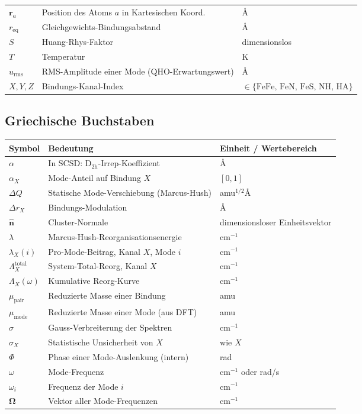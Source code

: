 \documentclass[11pt,a4paper,twoside]{article}
\providecommand{\angstrom}{\text{\AA}}    %
\theoremstyle{remark}
\begin{document}
\begin{tabular}{p{1.5cm} p{6cm} p{4cm}}
  $\mathbf{r}_a$  & Position des Atoms $a$ in Kartesischen Koord. & $\angstrom$ \\
  $r_\text{eq}$   & Gleichgewichts-Bindungsabstand & $\angstrom$ \\
  $S$             & Huang-Rhys-Faktor & dimensionslos \\
  $T$             & Temperatur & K \\
  $u_\text{rms}$  & RMS-Amplitude einer Mode (QHO-Erwartungswert) & $\angstrom$ \\
  $X, Y, Z$       & Bindungs-Kanal-Index & $\in \{\text{FeFe, FeN, FeS, NH, HA}\}$ \\
  \bottomrule
\end{tabular}

\subsection{Griechische Buchstaben}

\begin{tabular}{p{1.5cm} p{6cm} p{4cm}}
  \toprule
  \textbf{Symbol} & \textbf{Bedeutung} & \textbf{Einheit / Wertebereich} \\
  \midrule
  $\alpha$        & In SCSD: D$_\text{2h}$-Irrep-Koeffizient & $\angstrom$ \\
  $\alpha_X$      & Mode-Anteil auf Bindung $X$ & $[0, 1]$ \\
  $\Delta Q$      & Statische Mode-Verschiebung (Marcus-Hush) & amu$^{1/2}\angstrom$ \\
  $\Delta r_X$    & Bindungs-Modulation & $\angstrom$ \\
  $\hat{\mathbf{n}}$ & Cluster-Normale & dimensionsloser Einheitsvektor \\
  $\lambda$       & Marcus-Hush-Reorganisationsenergie & cm$^{-1}$ \\
  $\lambda_X(i)$  & Pro-Mode-Beitrag, Kanal $X$, Mode $i$ & cm$^{-1}$ \\
  $\Lambda_X^\text{total}$ & System-Total-Reorg, Kanal $X$ & cm$^{-1}$ \\
  $\Lambda_X(\omega)$ & Kumulative Reorg-Kurve & cm$^{-1}$ \\
  $\mu_\text{pair}$ & Reduzierte Masse einer Bindung & amu \\
  $\mu_\text{mode}$ & Reduzierte Masse einer Mode (aus DFT) & amu \\
  $\sigma$        & Gauss-Verbreiterung der Spektren & cm$^{-1}$ \\
  $\sigma_X$      & Statistische Unsicherheit von $X$ & wie $X$ \\
  $\Phi$          & Phase einer Mode-Auslenkung (intern) & rad \\
  $\omega$        & Mode-Frequenz & cm$^{-1}$ oder rad/s \\
  $\omega_i$      & Frequenz der Mode $i$ & cm$^{-1}$ \\
  $\mathbf{\Omega}$ & Vektor aller Mode-Frequenzen & cm$^{-1}$ \\
  \bottomrule
\end{tabular}
\end{document}
